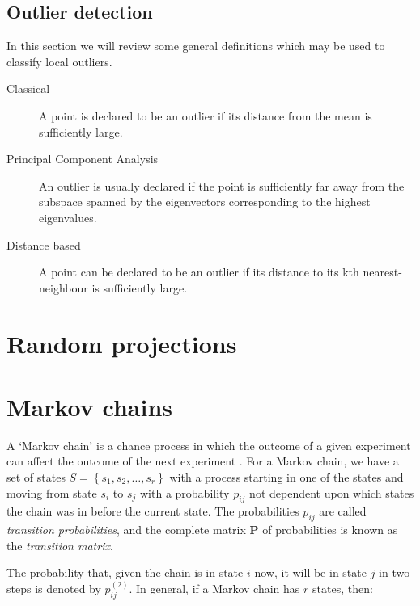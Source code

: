 \subsection{Outlier detection}
\label{sec:outlierDetection}
In this section we will review some general definitions which may be used to 
classify local outliers.

\begin{description}

\item[Classical] A point is declared to be an outlier if its distance from the 
mean is sufficiently large.
\item[Principal Component Analysis] An outlier is usually declared if the point 
is sufficiently far away from the subspace spanned by the eigenvectors 
corresponding to the highest eigenvalues.
\item[Distance based] A point can be declared to be an outlier if its distance 
to its kth nearest-neighbour is sufficiently large.

\end{description}

\section{Random projections}
\label{sec:randomProjections}

\section{Markov chains}
\label{sec:markovChains}
A `Markov chain' is a chance process in which the outcome of a given experiment 
can affect the outcome of the next experiment \cite{Grinstead:1997}. For a 
Markov chain, we have a set of states $S = \left\{ s_{1}, s_{2}, \ldots, s_{r} 
\right\}$ with a process starting in one of the states and moving from state 
$s_{i}$ to $s_{j}$ with a probability $p_{ij}$ not dependent upon which states 
the chain was in before the current state. The probabilities $p_{ij}$ are called
\emph{transition probabilities}, and the complete matrix $\mathbf{P}$ of 
probabilities is known as the \emph{transition matrix}.

The probability that, given the chain is in state $i$ now, it will be in state 
$j$ in two steps is denoted by $p_{ij}^{(2)}$. In general, if a Markov chain has 
$r$ states, then:

